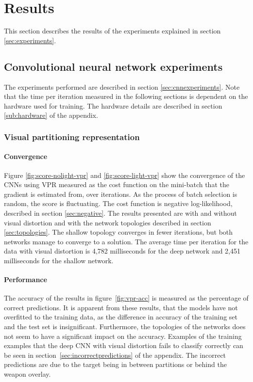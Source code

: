 
\section{Results}
This section describes the results of the experiments explained in section \ref{sec:experiments}.

\label{sec:results}

\subsection{Convolutional neural network experiments}
The experiments performed are described in section \ref{sec:cnnexperiments}. Note that the time per iteration measured in the following sections is dependent on the hardware used for training. The hardware details are described in section \ref{sub:hardware} of the appendix.

\subsubsection{Visual partitioning representation}
\paragraph{Convergence}
Figure \ref{fig:score-nolight-vpr} and \ref{fig:score-light-vpr} show the convergence of the CNNs using VPR measured as the cost function on the mini-batch that the gradient is estimated from, over iterations. As the process of batch selection is random, the score is fluctuating. The cost function is negative log-likelihood, described in section \ref{sec:negative}.
The results presented are with and without visual distortion and with the network topologies described in section \ref{sec:topologies}. The shallow topology converges in fewer iterations, but both networks manage to converge to a solution. The average time per iteration for the data with visual distortion is 4,782 milliseconds for the deep network and 2,451 milliseconds for the shallow network.


\paragraph{Performance}
The accuracy of the results in figure~\ref{fig:vpr-acc} is measured as the percentage of correct predictions. It is apparent from these results, that the models have not overfitted to the training data, as the difference in accuracy of the training set and the test set is insignificant. Furthermore, the topologies of the networks does not seem to have a significant impact on the accuracy. Examples of the training examples that the deep CNN with visual distortion fails to classify correctly can be seen in section~\ref{sec:incorrectpredictions} of the appendix. The incorrect predictions are due to the target being in between partitions or behind the weapon overlay.

